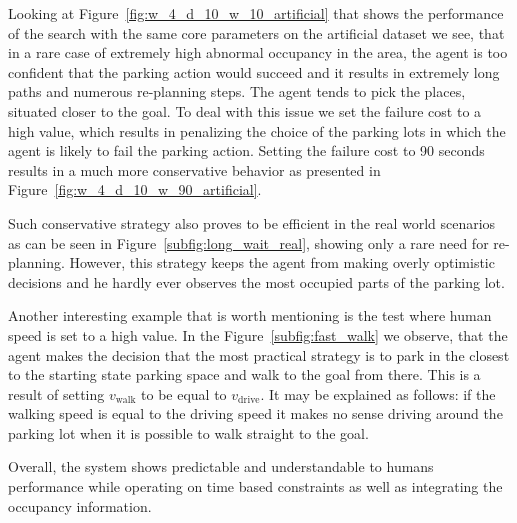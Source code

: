 Looking at Figure~\ref{fig:w_4_d_10_w_10_artificial} that shows the
performance of the search with the same core parameters on the artificial
dataset we see, that in a rare case of extremely high abnormal occupancy in
the area, the agent is too confident that the parking action would succeed and
it results in extremely long paths and numerous re-planning steps. The agent
tends to pick the places, situated closer to the goal. To deal with this issue
we set the failure cost to a high value, which results in penalizing the
choice of the parking lots in which the agent is likely to fail the parking
action. Setting the failure cost to 90 seconds results in a much more
conservative behavior as presented in
Figure~\ref{fig:w_4_d_10_w_90_artificial}.

Such conservative strategy also proves to be efficient in the real world
scenarios as can be seen in Figure~\ref{subfig:long_wait_real}, showing only a
rare need for re-planning. However, this strategy keeps the agent from making
overly optimistic decisions and he hardly ever observes the most occupied
parts of the parking lot.

Another interesting example that is worth mentioning is the test where human
speed is set to a high value. In the Figure~\ref{subfig:fast_walk} we observe,
that the agent makes the decision that the most practical strategy is to park
in the closest to the starting state parking space and walk to the goal from
there. This is a result of setting $v_{\mathrm{walk}}$ to be equal to $v_{\mathrm{drive}}$. It
may be explained as follows: if the walking speed is equal to the driving
speed it makes no sense driving around the parking lot when it is possible to
walk straight to the goal.

Overall, the system shows predictable and understandable to humans performance
while operating on time based constraints as well as integrating the occupancy
information.


